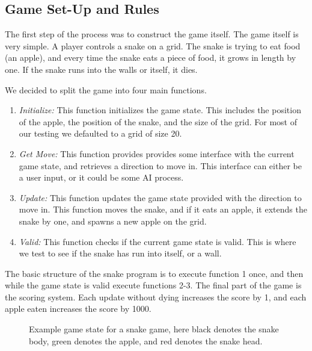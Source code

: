 \documentclass{amsart}
\begin{document}
\subsection{Game Set-Up and Rules}

The first step of the process was to construct the game itself. The game
itself is very simple. A player controls a snake on a grid. The snake is
trying to eat food (an apple), and every time the snake eats a piece of food,
it grows in length by one. If the snake runs into the walls or itself, it dies.

We decided to split the game into four main functions.
\begin{enumerate}
  \item \textit{Initialize:} This function initializes the game state. This
    includes the position of the apple, the position of the snake, and the size
    of the grid. For most of our testing we defaulted to a grid of size 20.
  \item \textit{Get Move:} This function provides provides some interface with
    the current game state, and retrieves a direction to move in. This
    interface can either be a user input, or it could be some AI process.
  \item \textit{Update:} This function updates the game state provided with
    the direction to move in. This function moves the snake, and if it eats an
    apple, it extends the snake by one, and spawns a new apple on the grid.
  \item \textit{Valid:} This function checks if the current game state is
    valid. This is where we test to see if the snake has run into itself, or a
    wall.
\end{enumerate}

The basic structure of the snake program is to execute function 1 once, and
then while the game state is valid execute functions 2-3. The final part of the
game is the scoring system. Each update without dying increases the score by
1, and each apple eaten increases the score by 1000.

\begin{figure}[htpb]
  \begin{center}
  \end{center}
  \caption{Example game state for a snake game, here black denotes the snake
  body, green denotes the apple, and red denotes the snake head.}
  \label{fig:snake_game}
\end{figure}
\end{document}
